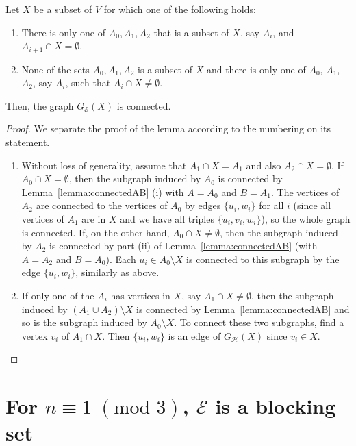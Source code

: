 \documentclass[11pt,a4paper]{article}
\begin{document}
\begin{lemma}\label{lemma:connected2}
     Let $X$ be a subset of $V$ for which one of the following holds:
    \begin{enumerate}
        \item There is only one of $A_0, A_1, A_2$ that is a subset of $X$, say $A_i$, and $A_{i+1} \cap X = \emptyset$.
        \item None of the sets $A_0, A_1, A_2$ is a subset of $X$ and there is only one of $A_0$, $A_1$, $A_2$, say $A_i$, such that $A_i \cap X \neq \emptyset$.
    \end{enumerate}
Then, the graph $G_{\mathcal{E}} (X)$ is connected.
\end{lemma}

\begin{proof}
We separate the proof of the lemma according to the numbering on its statement.
\begin{enumerate}
    \item Without loss of generality, assume that $A_1 \cap X=A_1$ and also $A_2\cap X=\emptyset$. If $A_0 \cap X = \emptyset$, then the subgraph induced by $A_0$ is connected by Lemma~\ref{lemma:connectedAB} (i) with $A=A_0$ and $B=A_1$. The vertices of $A_2$ are connected to the vertices of $A_0$ by edges $\{u_i,w_i\}$ for all $i$ (since all vertices of $A_1$ are in $X$ and we have all triples $\{u_i,v_i,w_i\}$), so the whole graph is connected. If, on the other hand, $A_0\cap X\neq\emptyset$, then the subgraph induced by $A_2$ is connected by part (ii) of Lemma~\ref{lemma:connectedAB} (with $A=A_2$ and $B=A_0$). Each $u_i\in A_0\setminus X$ is connected to this subgraph by the edge $\{u_i,w_i\}$, similarly as above.
    \item If only one of the $A_i$ has vertices in $X$, say $A_1\cap X\neq \emptyset$, then the subgraph induced by $(A_1\cup A_2)\setminus X$ is connected by Lemma~\ref{lemma:connectedAB} and so is the subgraph induced by $A_0\setminus X$. To connect these two subgraphs, find a vertex $v_i$ of $A_1\cap X$. Then $\{u_i,w_i\}$ is an edge of $G_{\mathcal{H}}(X)$ since $v_i\in X$.
\end{enumerate}
\end{proof}







\section{For \texorpdfstring{$n \equiv 1 \; ({\mbox{mod }} 3)$, $\mathcal{E}$}{} is a blocking set}
\end{document}
